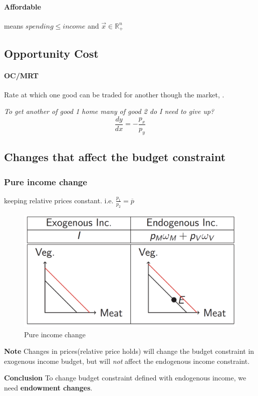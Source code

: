 \documentclass{article}
\begin{document}
	\paragraph{Affordable} means $spending \leq income$ and $\vec{x} \in \mathbb{R}^n_{+}$
	\subsection{Opportunity Cost}
	\paragraph{OC/MRT} Rate at which one good can be traded for another though the market, .
	
	\emph{To get another  of good 1 home many  of good 2 do I need to give up?}
	\[
		\frac{dy}{dx} = -\frac{p_x}{p_y}
	\]
	\subsection{Changes that affect the budget constraint}
	\subsubsection{Pure income change} keeping relative prices constant. i.e. $\frac{p_1}{p_2} = \overline{p}$
	\begin{figure}[h]
		\centering
		\includegraphics[width=0.5\linewidth]{eco206pic/income_change}
		\caption{Pure income change}
	\end{figure}
	
	
	\textbf{Note} Changes in prices(relative price holds) will change the budget constraint in exogenous income budget, but will \emph{not} affect the endogenous income constraint.
	
	\textbf{Conclusion} To change budget constraint defined with endogenous income, we need \textbf{endowment changes}.
	
\end{document}
